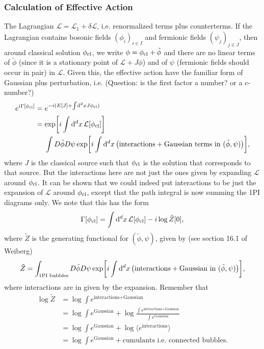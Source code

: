 \documentclass{article}
\begin{document}
\subsubsection{Calculation of Effective Action}

The Lagrangian $\mathcal{L} = \mathcal{L}_1 + \delta\mathcal{L}$, i.e. renormalized terms plus counterterms.
If the Lagrangian contains bosonic fields $(\phi_i)_{i\in I}$ and fermionic fields $(\psi_j)_{j\in J}$, then around classical solution $\phi_{\textnormal{cl}}$, we write $\phi = \phi_{\textnormal{cl}} + \tilde{\phi}$ and there are no linear terms of $\tilde{\phi}$ (since it is a stationary point of $\mathcal{L} + J\phi$) and of $\psi$ (fermionic fields should occur in pair) in $\mathcal{L}$.
Given this, the effective action have the familiar form of Gaussian plus perturbation, i.e. ({\color{red}Question: is the first factor a number? or a c-number?})
\begin{align*}
    e^{i\Gamma[\phi_{\textnormal{cl}}]} &= e^{-i(E[J] + \int \dd[d]{x} J\phi_{\textnormal{cl}})} \\
    &= \exp[i\int \dd[d]{x} \mathcal{L}[\phi_{\textnormal{cl}}]] \\
    &\phantom{{}={}} \int D\tilde{\phi} D\psi \exp[i\int \dd[d]{x}\qty(\text{interactions} + \text{Gaussian terms in }(\tilde{\phi},\psi))],
\end{align*}
where $J$ is the classical source such that $\phi_{\textnormal{cl}}$ is the solution that corresponds to that source.
But the interactions here are not just the ones given by expanding $\mathcal{L}$ around $\phi_{\textnormal{cl}}$.
It can be shown that we could indeed put interactions to be just the expansion of $\mathcal{L}$ around $\phi_{\textnormal{cl}}$, except that the path integral is now summing the 1PI diagrams only.
We note that this has the form
\[ \Gamma[\phi_{\textnormal{cl}}] = \int \dd[d]{x} \mathcal{L}[\phi_{\textnormal{cl}}] -i\log \tilde{Z}[0], \]
where $\tilde{Z}$ is the generating functional for $(\tilde{\phi},\psi)$, given by (see section 16.1 of Weiberg)
\[ \tilde{Z} = \int_{\text{1PI bubbles}} D\tilde{\phi} D\psi \exp[i\int \dd[d]{x}\qty(\text{interactions} + \text{Gaussian in }(\tilde{\phi},\psi))], \]
where interactions are in given by the expansion.
Remember that
\begin{align*}
    \log \tilde{Z} &= \log \int e^{\text{interactions} + \text{Gaussian}} \\
    &= \log \int e^{\text{Gaussian}} + \log \frac{\int e^{\text{interactions} + \text{Gaussian}}}{\int e^{\text{Gaussian}}} \\
    &= \log \int e^{\text{Gaussian}} + \log \langle e^{\text{interactions}} \rangle \\
    &= \log \int e^{\text{Gaussian}} + \text{cumulants i.e. connected bubbles}.
\end{align*}
\end{document}

